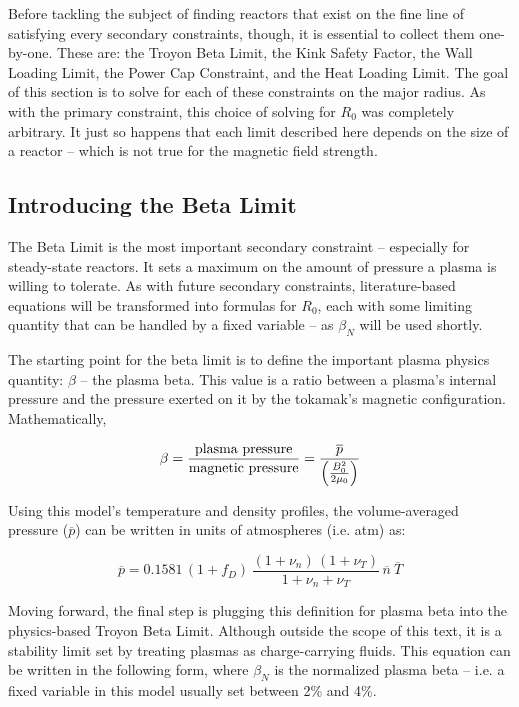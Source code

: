 Before tackling the subject of finding reactors that exist on the fine line of satisfying every secondary constraints, though, it is essential to collect them one-by-one. These are: the Troyon Beta Limit, the Kink Safety Factor, the Wall Loading Limit, the Power Cap Constraint, and the Heat Loading Limit. The goal of this section is to solve for each of these constraints on the major radius. As with the primary constraint, this choice of solving for $R_0$ was completely arbitrary. It just so happens that each limit described here depends on the size of a reactor -- which is not true for the magnetic field strength.

\subsection{Introducing the Beta Limit}

The Beta Limit is the most important secondary constraint -- especially for steady-state reactors. It sets a maximum on the amount of pressure a plasma is willing to tolerate. As with future secondary constraints, literature-based equations will be transformed into formulas for $R_0$, each with some limiting quantity that can be handled by a fixed variable -- as $\beta_N$ will be used shortly.

The starting point for the beta limit is to define the important plasma physics quantity: $\beta$ -- the plasma beta. This value is a ratio between a plasma's internal pressure and the pressure exerted on it by the tokamak's magnetic configuration. Mathematically,

\begin{equation}
	\label{eq:beta}
	\beta = \frac{\textnormal{plasma pressure}}{\textnormal{magnetic pressure}} = \frac{ \overline p }{ \left( \frac{B_0^2}{2 \mu_0} \right) }
\end{equation}

Using this model's temperature and density profiles, the volume-averaged pressure ($\overline p$) can be written in units of atmospheres (i.e. atm) as:

\begin{equation}
  \overline{p} = 0.1581 \, ( 1 + f_D ) \, \frac{ (1 + \nu_n) \, (1 + \nu_T) }{1 + \nu_n + \nu_T } \, \overline{n} \ \overline{T}
\end{equation}

Moving forward, the final step is plugging this definition for plasma beta into the physics-based Troyon Beta Limit. Although outside the scope of this text, it is a stability limit set by treating plasmas as charge-carrying fluids. This equation can be written in the following form, where $\beta_N$ is the normalized plasma beta -- i.e. a fixed variable in this model usually set between 2\% and 4\%.

